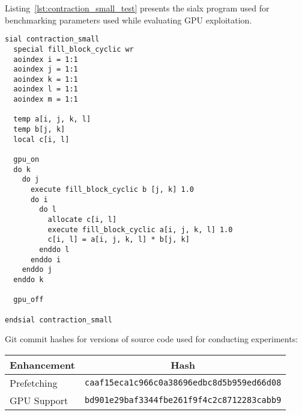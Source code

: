 Listing~\ref{lst:contraction_small_test} presents the sialx program used for benchmarking
parameters used while evaluating GPU exploitation.

\begin{lstlisting}[caption={\texttt{contraction\_small\_test.sialx}: sialx program to benchmark GPU exploitation},
  label={lst:contraction_small_test}]
sial contraction_small
  special fill_block_cyclic wr
  aoindex i = 1:1
  aoindex j = 1:1
  aoindex k = 1:1
  aoindex l = 1:1
  aoindex m = 1:1

  temp a[i, j, k, l]
  temp b[j, k]
  local c[i, l]

  gpu_on
  do k
    do j
      execute fill_block_cyclic b [j, k] 1.0
      do i
        do l
          allocate c[i, l]
          execute fill_block_cyclic a[i, j, k, l] 1.0
          c[i, l] = a[i, j, k, l] * b[j, k]
        enddo l
      enddo i
    enddo j
  enddo k

  gpu_off

endsial contraction_small
\end{lstlisting}

Git commit hashes for versions of source code used for conducting experiments:
\begin{tabular}{l c}
  \hline
  Enhancement & Hash                                              \\
  \hline
  Prefetching & \texttt{caaf15eca1c966c0a38696edbc8d5b959ed66d08} \\
  GPU Support & \texttt{bd901e29baf3344fbe261f9f4c2c8712283cabb9} \\
  \hline
\end{tabular}
